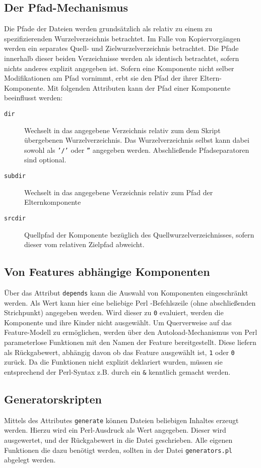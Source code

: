 \documentclass[a4paper]{article}
\begin{document}
\subsection{Der Pfad-Mechanismus}
Die Pfade der Dateien werden grundsätzlich als relativ zu einem zu spezifizierenden Wurzelverzeichnis betrachtet. Im Falle von Kopiervorgängen werden ein separates Quell- und Zielwurzelverzeichnis betrachtet. Die Pfade innerhalb dieser beiden
Verzeichnisse werden als identisch betrachtet, sofern nichts anderes explizit angegeben ist. Sofern eine Komponente nicht selber 
Modifikationen am Pfad vornimmt, erbt  sie den Pfad der ihrer Eltern-Komponente. Mit folgenden Attributen kann der Pfad einer Komponente beeinflusst werden:
\begin{description}
	\item[\texttt{dir}] Wechselt in das angegebene 
	Verzeichnis relativ zum dem Skript übergebenen  Wurzelverzeichnis.
	Das Wurzelverzeichnis selbst kann 
	dabei sowohl als \texttt{'/'} oder \texttt{''} angegeben werden.
 	Abschließende Pfadseparatoren sind optional. 
	\item[\texttt{subdir}] Wechselt in das angegebene Verzeichnis relativ zum Pfad der Elternkomponente
	\item[\texttt{srcdir}] Quellpfad der Komponente bezüglich des Quellwurzelverzeichnisses, sofern dieser vom relativen Zielpfad abweicht.
\end{description}

\subsection{Von Features abhängige Komponenten}
Über das Attribut \texttt{depends} kann die Auswahl von Komponenten
eingeschränkt werden. Als Wert kann hier eine beliebige Perl
-Befehlszeile (ohne abschließenden Strichpunkt) angegeben werden.
Wird dieser zu \texttt{0} evaluiert, werden die 
Komponente und ihre Kinder nicht ausgewählt. 
Um Querverweise auf das Feature-Modell zu ermöglichen,
werden über den Autoload-Mechanismus von Perl parameterlose Funktionen mit den
Namen der Feature bereitgestellt. Diese liefern als Rückgabewert, abhängig davon
ob das Feature ausgewählt ist, \texttt{1} oder \texttt{0} zurück.
Da die Funktionen nicht explizit deklariert wurden, müssen sie entsprechend der
Perl-Syntax z.B. durch ein \texttt{\&} kenntlich gemacht werden.



\subsection{Generatorskripten}
Mittels des Attributes \texttt{generate} können 
Dateien beliebigen Inhaltes erzeugt werden. Hierzu wird ein  Perl-Ausdruck als Wert angegeben.
Dieser wird ausgewertet, und der Rückgabewert in die Datei geschrieben.
Alle eigenen Funktionen die dazu benötigt werden, sollten in der Datei \texttt{generators.pl}
abgelegt werden.
\end{document}

